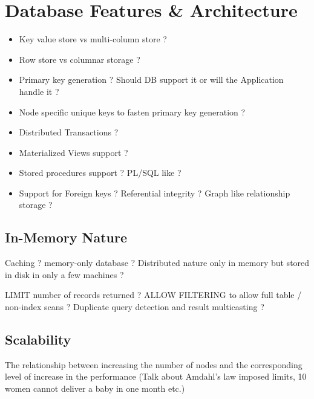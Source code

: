 \section{Database Features & Architecture}

\begin{itemize}
\item Key value store vs multi-column store ?
\end{itemize}
\begin{itemize}
\item Row store vs columnar storage ?
\end{itemize}
\begin{itemize}
\item Primary key generation ? Should DB support it or will the Application handle it ?
\end{itemize}
\begin{itemize}
\item Node specific unique keys to fasten primary key generation ?
\end{itemize}
\begin{itemize}
\item Distributed Transactions ?
\end{itemize}
\begin{itemize}
\item Materialized Views support ?
\end{itemize}
\begin{itemize}
\item Stored procedures support ? PL/SQL like ?
\end{itemize}
\begin{itemize}
\item Support for Foreign keys ? Referential integrity ? Graph like relationship storage ?
\end{itemize}

\subsection{In-Memory Nature}
Caching ?
memory-only database ?
Distributed nature only in memory but stored in disk in only a few machines ?

LIMIT number of records returned ?
ALLOW FILTERING to allow full table / non-index scans ?
Duplicate query detection and result multicasting ?

\subsection{Scalability}
The relationship between increasing the number of nodes and the corresponding level of increase in the performance (Talk about Amdahl's law imposed limits, 10 women cannot deliver a baby in one month etc.)
